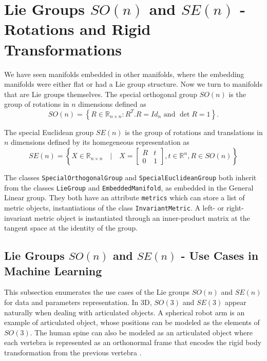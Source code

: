 \documentclass{article}
\begin{document}
\section{Lie Groups $SO(n)$ and $SE(n)$ - Rotations and Rigid Transformations}\label{sec:se3}

We have seen manifolds embedded in other manifolds, where the embedding manifolds were either flat or had a Lie group structure. Now we turn to manifolds that are Lie groups themselves. The special orthogonal group $SO(n)$ is the group of rotations in $n$ dimensions defined as
\begin{equation}
SO(n) = \left\{
R \in \mathbb{R}_{n \times n }: R^T.R = Id_n \text{ and } \det R = 1
\right\}.
\end{equation}

The special Euclidean group $SE(n)$ is the group of rotations and translations in $n$ dimensions defined by its homegeneous representation as
\begin{equation}
SE(n) = \left\{ X \in \mathbb{R}_{n \times n } \quad | \quad X = \left[ \begin{array}{c|c} R & t \\ \hline 0 & 1 \end{array} \right], t \in \mathbb{R}^n, R \in SO(n) \right\}
\end{equation}

The classes \texttt{SpecialOrthogonalGroup} and \texttt{SpecialEuclideanGroup} both inherit from the classes \texttt{LieGroup} and \texttt{EmbeddedManifold}, as embedded in the General Linear group. They both have an attribute \texttt{metrics} which can store a list of metric objects, instantiations of the class \texttt{InvariantMetric}. A left- or right- invariant metric object is instantiated through an inner-product matrix at the tangent space at the identity of the group.

\subsection{Lie Groups $SO(n)$ and $SE(n)$ - Use Cases in Machine Learning}

This subsection enumerates the use cases of the Lie groups $SO(n)$ and $SE(n)$ for data and parameters representation. In 3D, $SO(3)$ and $SE(3)$ appear naturally when dealing with articulated objects. A spherical robot arm is an example of articulated object, whose positions can be modeled as the elements of $SO(3)$. The human spine can also be modeled as an articulated object where each vertebra is represented as an orthonormal frame that encodes the rigid body transformation from the previous vertebra \cite{Arsigny:PHD:2006, Boisvert2008}. 
\end{document}
